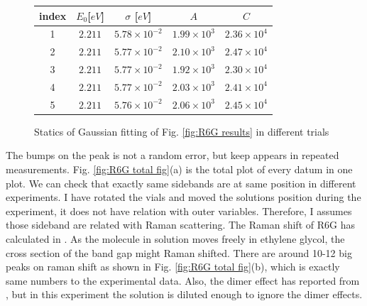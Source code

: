 \documentclass{article}
\begin{document}
\begin{figure}[H]
  \centering
  \begin{tabular}{|c| c| c|c|c|}
      index  & $E_0 $[$eV$]  & $\sigma$ [$eV$] & $A$ & $C$\\
      \hline
      1 & $2.211$ & $5.78\times 10^{-2}$ & $1.99 \times 10^3$ & $2.36 \times 10^4$\\
      2 & $2.211$ & $5.77\times 10^{-2}$ & $2.10 \times 10^3$ & $2.47 \times 10^4$\\
      3 & $2.211$ & $5.77\times 10^{-2}$ & $1.92 \times 10^3$ & $2.30 \times 10^4$\\
      4 & $2.211$ & $5.77\times 10^{-2}$ & $2.03 \times 10^3$ & $2.41 \times 10^4$\\
      5 & $2.211$ & $5.76\times 10^{-2}$ & $2.06 \times 10^3$ & $2.45 \times 10^4$\\
      
  \end{tabular}
  \caption{Statics of Gaussian fitting of Fig. \ref{fig:R6G results} in different trials}
  \label{fig:R6G optimize results}
\end{figure}

The bumps on the peak is not a random error, but keep appears in repeated measurements.
Fig. \ref{fig:R6G total fig}(a) is the total plot of every datum in one plot.
We can check that exactly same sidebands are at same position in different experiments.
I have rotated the vials and moved the solutions position during the experiment, it does not have relation with outer variables.
Therefore, I assumes those sideband are related with Raman scattering.
The Raman shift of R6G has calculated in \cite{rhodamine_HOMO_LUMO}.
As the molecule in solution moves freely in ethylene glycol, the cross section of the band gap might Raman shifted.
There are around 10-12 big peaks on raman shift as shown in Fig. \ref{fig:R6G total fig}(b), which is exactly same numbers to the experimental data.
Also, the dimer effect has reported from \cite{Rhodamine_dimer}, but in this experiment the solution is diluted enough to ignore the dimer effects.
\end{document}
